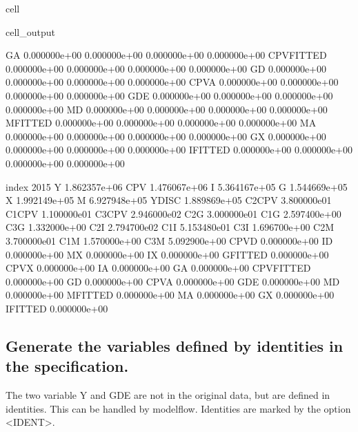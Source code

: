 \documentclass[letterpaper,10pt,english]{jupyterBook}
\begin{document}
\begin{sphinxuseclass}{cell}
\begin{sphinxVerbatimOutput}
\begin{sphinxuseclass}{cell_output}
\begin{sphinxVerbatim}[commandchars=\\\{\}]
G\PYGZus{}A         0.000000e+00  0.000000e+00  0.000000e+00  0.000000e+00   
CPV\PYGZus{}FITTED  0.000000e+00  0.000000e+00  0.000000e+00  0.000000e+00   
G\PYGZus{}D         0.000000e+00  0.000000e+00  0.000000e+00  0.000000e+00   
CPV\PYGZus{}A       0.000000e+00  0.000000e+00  0.000000e+00  0.000000e+00   
GDE         0.000000e+00  0.000000e+00  0.000000e+00  0.000000e+00   
M\PYGZus{}D         0.000000e+00  0.000000e+00  0.000000e+00  0.000000e+00   
M\PYGZus{}FITTED    0.000000e+00  0.000000e+00  0.000000e+00  0.000000e+00   
M\PYGZus{}A         0.000000e+00  0.000000e+00  0.000000e+00  0.000000e+00   
G\PYGZus{}X         0.000000e+00  0.000000e+00  0.000000e+00  0.000000e+00   
I\PYGZus{}FITTED    0.000000e+00  0.000000e+00  0.000000e+00  0.000000e+00   

index               2015  
Y           1.862357e+06  
CPV         1.476067e+06  
I           5.364167e+05  
G           1.544669e+05  
X           1.992149e+05  
M           6.927948e+05  
YDISC       1.889869e+05  
C2\PYGZus{}CPV      3.800000e\PYGZhy{}01  
C1\PYGZus{}CPV     \PYGZhy{}1.100000e\PYGZhy{}01  
C3\PYGZus{}CPV      2.946000e\PYGZhy{}02  
C2\PYGZus{}G        3.000000e\PYGZhy{}01  
C1\PYGZus{}G       \PYGZhy{}2.597400e+00  
C3\PYGZus{}G        1.332000e+00  
C2\PYGZus{}I        2.794700e\PYGZhy{}02  
C1\PYGZus{}I       \PYGZhy{}5.153480e\PYGZhy{}01  
C3\PYGZus{}I        1.696700e+00  
C2\PYGZus{}M        3.700000e\PYGZhy{}01  
C1\PYGZus{}M       \PYGZhy{}1.570000e+00  
C3\PYGZus{}M        5.092900e+00  
CPV\PYGZus{}D       0.000000e+00  
I\PYGZus{}D         0.000000e+00  
M\PYGZus{}X         0.000000e+00  
I\PYGZus{}X         0.000000e+00  
G\PYGZus{}FITTED    0.000000e+00  
CPV\PYGZus{}X       0.000000e+00  
I\PYGZus{}A         0.000000e+00  
G\PYGZus{}A         0.000000e+00  
CPV\PYGZus{}FITTED  0.000000e+00  
G\PYGZus{}D         0.000000e+00  
CPV\PYGZus{}A       0.000000e+00  
GDE         0.000000e+00  
M\PYGZus{}D         0.000000e+00  
M\PYGZus{}FITTED    0.000000e+00  
M\PYGZus{}A         0.000000e+00  
G\PYGZus{}X         0.000000e+00  
I\PYGZus{}FITTED    0.000000e+00  
\end{sphinxVerbatim}

\end{sphinxuseclass}\end{sphinxVerbatimOutput}

\end{sphinxuseclass}

\subsection{Generate the variables defined by identities in the specification.}
\label{\detokenize{content/howto/smallmodel/modelstart:generate-the-variables-defined-by-identities-in-the-specification}}
\sphinxAtStartPar
The two variable Y and GDE are not in the original data, but are defined in identities. This can be
handled by modelflow. Identities are marked by the option  <IDENT>.
\end{document}
